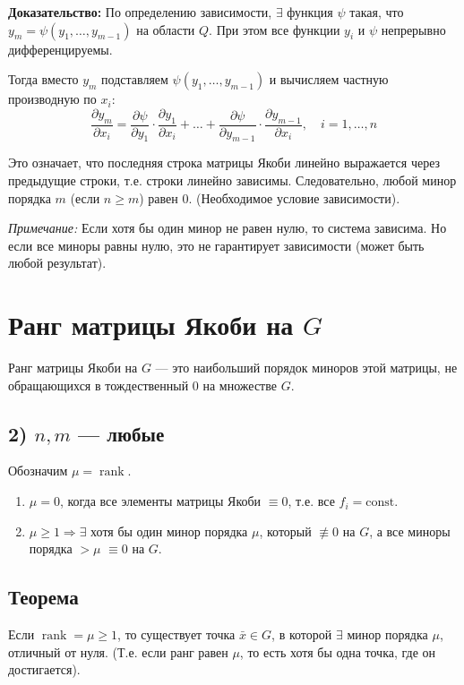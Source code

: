 \documentclass{article}
\begin{document}
\textbf{Доказательство:} По определению зависимости, $\exists$ функция $\psi$ такая, что $y_m = \psi(y_1, \dots, y_{m-1})$ на области $Q$. При этом все функции $y_i$ и $\psi$ непрерывно дифференцируемы.

Тогда вместо $y_m$ подставляем $\psi(y_1, \dots, y_{m-1})$ и вычисляем частную производную по $x_i$:
\[
\frac{\partial y_m}{\partial x_i} = \frac{\partial \psi}{\partial y_1} \cdot \frac{\partial y_1}{\partial x_i} + \dots + \frac{\partial \psi}{\partial y_{m-1}} \cdot \frac{\partial y_{m-1}}{\partial x_i}, \quad i = 1, \dots, n
\]

Это означает, что последняя строка матрицы Якоби линейно выражается через предыдущие строки, т.е. строки линейно зависимы. Следовательно, любой минор порядка $m$ (если $n \geq m$) равен 0. (Необходимое условие зависимости).

\textit{Примечание:} Если хотя бы один минор не равен нулю, то система зависима. Но если все миноры равны нулю, это не гарантирует зависимости (может быть любой результат).

\section*{Ранг матрицы Якоби на $G$}

Ранг матрицы Якоби на $G$ — это наибольший порядок миноров этой матрицы, не обращающихся в тождественный 0 на множестве $G$.

\subsection*{2) $n, m$ — любые}

Обозначим $\mu = \operatorname{rank}$.

\begin{enumerate}
    \item $\mu = 0$, когда все элементы матрицы Якоби $\equiv 0$, т.е. все $f_i = \text{const}$.
    \item $\mu \geq 1 \Rightarrow \exists$ хотя бы один минор порядка $\mu$, который $\not\equiv 0$ на $G$, а все миноры порядка $> \mu$ $\equiv 0$ на $G$.
\end{enumerate}

\subsection*{Теорема}

Если $\operatorname{rank} = \mu \geq 1$, то существует точка $\bar{x} \in G$, в которой $\exists$ минор порядка $\mu$, отличный от нуля. (Т.е. если ранг равен $\mu$, то есть хотя бы одна точка, где он достигается).
\end{document}
